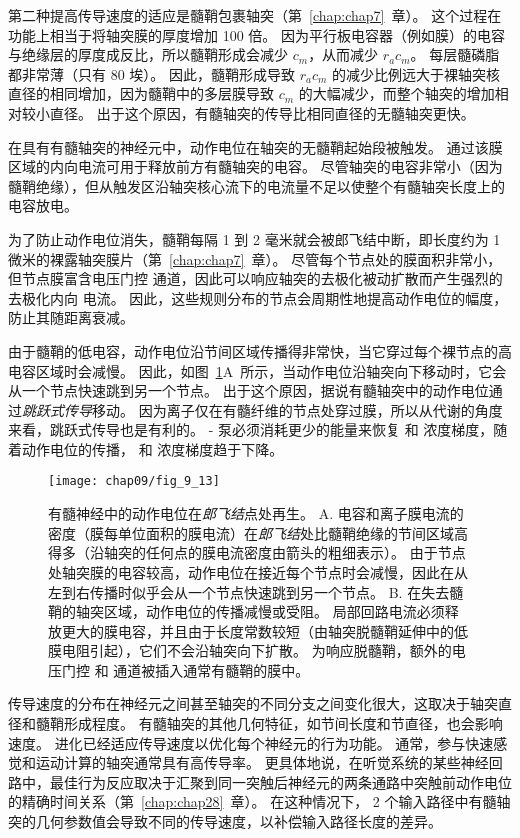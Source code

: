 第二种提高传导速度的适应是髓鞘包裹轴突（第~\ref{chap:chap7}~章）。
这个过程在功能上相当于将轴突膜的厚度增加 100 倍。
因为平行板电容器（例如膜）的电容与绝缘层的厚度成反比，所以髓鞘形成会减少 $c_m$，从而减少 $r_a c_m$。
每层髓磷脂都非常薄（只有 80 埃）。
因此，髓鞘形成导致 $r_a c_m$ 的减少比例远大于裸轴突核直径的相同增加，因为髓鞘中的多层膜导致 $c_m$ 的大幅减少，而整个轴突的增加相对较小直径。
出于这个原因，有髓轴突的传导比相同直径的无髓轴突更快。


在具有有髓轴突的神经元中，动作电位在轴突的无髓鞘起始段被触发。
通过该膜区域的内向电流可用于释放前方有髓轴突的电容。
尽管轴突的电容非常小（因为髓鞘绝缘），但从触发区沿轴突核心流下的电流量不足以使整个有髓轴突长度上的电容放电。


为了防止动作电位消失，髓鞘每隔 1 到 2 毫米就会被郎飞结中断，即长度约为 1 微米的裸露轴突膜片（第~\ref{chap:chap7}~章）。
尽管每个节点处的膜面积非常小，但节点膜富含电压门控  通道，因此可以响应轴突的去极化被动扩散而产生强烈的去极化内向  电流。
因此，这些规则分布的节点会周期性地提高动作电位的幅度，防止其随距离衰减。


由于髓鞘的低电容，动作电位沿节间区域传播得非常快，当它穿过每个裸节点的高电容区域时会减慢。
因此，如图~\ref{fig:9_13}A~所示，当动作电位沿轴突向下移动时，它会从一个节点快速跳到另一个节点。
出于这个原因，据说有髓轴突中的动作电位通过\textit{跳跃式传导}移动。
因为离子仅在有髓纤维的节点处穿过膜，所以从代谢的角度来看，跳跃式传导也是有利的。
- 泵必须消耗更少的能量来恢复  和  浓度梯度，随着动作电位的传播， 和  浓度梯度趋于下降。


\begin{figure}[htbp]
	\centering
	\texttt{[image: chap09/fig\_9\_13]}
	\caption{有髓神经中的动作电位在\textit{郎飞结}点处再生。
		A. 电容和离子膜电流的密度（膜每单位面积的膜电流）在\textit{郎飞结}处比髓鞘绝缘的节间区域高得多（沿轴突的任何点的膜电流密度由箭头的粗细表示）。
		由于节点处轴突膜的电容较高，动作电位在接近每个节点时会减慢，因此在从左到右传播时似乎会从一个节点快速跳到另一个节点。
		B. 在失去髓鞘的轴突区域，动作电位的传播减慢或受阻。
		局部回路电流必须释放更大的膜电容，并且由于长度常数较短（由轴突脱髓鞘延伸中的低膜电阻引起），它们不会沿轴突向下扩散。
		为响应脱髓鞘，额外的电压门控  和  通道被插入通常有髓鞘的膜中。}
	\label{fig:9_13}
\end{figure}


传导速度的分布在神经元之间甚至轴突的不同分支之间变化很大，这取决于轴突直径和髓鞘形成程度。
有髓轴突的其他几何特征，如节间长度和节直径，也会影响速度。
进化已经适应传导速度以优化每个神经元的行为功能。
通常，参与快速感觉和运动计算的轴突通常具有高传导率。
更具体地说，在听觉系统的某些神经回路中，最佳行为反应取决于汇聚到同一突触后神经元的两条通路中突触前动作电位的精确时间关系（第~\ref{chap:chap28}~章）。
在这种情况下， 2 个输入路径中有髓轴突的几何参数值会导致不同的传导速度，以补偿输入路径长度的差异。


